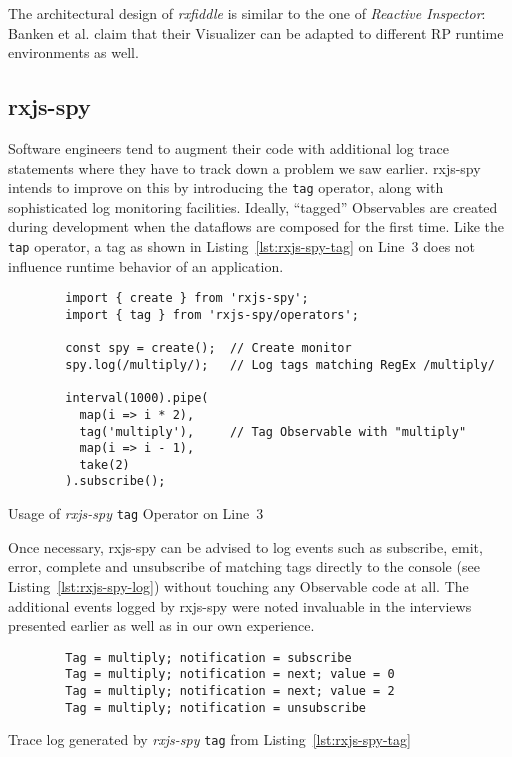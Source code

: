 \documentclass[12pt,a4paper]{article}
\begin{document}
The architectural design of \emph{rxfiddle} is similar to the one of \emph{Reactive Inspector}: Banken et al. claim that their Visualizer can be adapted to different RP runtime environments as well.

\subsection{rxjs-spy}

Software engineers tend to augment their code with additional log trace statements where they have to track down a problem we saw earlier. rxjs-spy\cite{rxjsspy} intends to improve on this by introducing the \texttt{tag} operator, along with sophisticated log monitoring facilities. Ideally, ``tagged'' Observables are created during development when the dataflows are composed for the first time. Like the \texttt{tap} operator, a tag as shown in Listing~\ref{lst:rxjs-spy-tag} on Line~3 does not influence runtime behavior of an application.

\begin{listing}[H]
	\begin{verbatim}
		import { create } from 'rxjs-spy';
		import { tag } from 'rxjs-spy/operators';

		const spy = create();  // Create monitor
		spy.log(/multiply/);   // Log tags matching RegEx /multiply/

		interval(1000).pipe(
		  map(i => i * 2),
		  tag('multiply'),     // Tag Observable with "multiply"
		  map(i => i - 1),
		  take(2)
		).subscribe();
	\end{verbatim}
	\caption{Usage of \emph{rxjs-spy} \texttt{tag} Operator on Line~3}
	\label{lst:rxjs-spy-tag}
\end{listing}

Once necessary, rxjs-spy can be advised to log events such as subscribe, emit, error, complete and unsubscribe of matching tags directly to the console (see Listing~\ref{lst:rxjs-spy-log}) without touching any Observable code at all. The additional events logged by rxjs-spy were noted invaluable in the interviews presented earlier as well as in our own experience.

\begin{listing}[H]
	\begin{verbatim}
		Tag = multiply; notification = subscribe
		Tag = multiply; notification = next; value = 0
		Tag = multiply; notification = next; value = 2
		Tag = multiply; notification = unsubscribe
	\end{verbatim}
	\caption{Trace log generated by \emph{rxjs-spy} \texttt{tag} from Listing~\ref{lst:rxjs-spy-tag}}
	\label{lst:rxjs-spy-log}
\end{listing}
\end{document}
